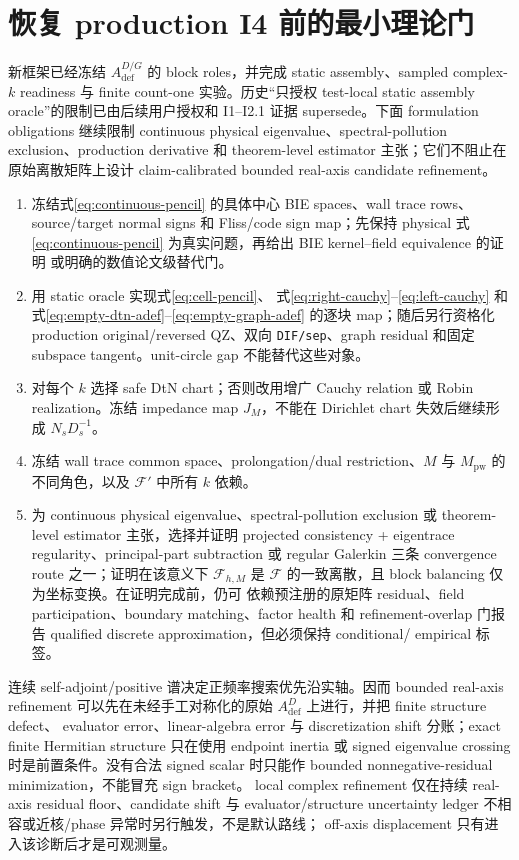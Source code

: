 \documentclass[UTF8,fontset=fandol,11pt,a4paper]{ctexart}
\newcommand{\cF}{\mathcal F}
\begin{document}
\section{恢复 production I4 前的最小理论门}

新框架已经冻结 $A_{\mathrm{def}}^{D/G}$ 的 block roles，并完成 static assembly、sampled
complex-$k$ readiness 与 finite count-one 实验。历史“只授权 test-local static assembly
oracle”的限制已由后续用户授权和 I1--I2.1 证据 supersede。下面 formulation obligations
继续限制 continuous physical eigenvalue、spectral-pollution exclusion、production
derivative 和 theorem-level estimator 主张；它们不阻止在原始离散矩阵上设计
claim-calibrated bounded real-axis candidate refinement。
\begin{enumerate}
  \item 冻结式\eqref{eq:continuous-pencil} 的具体中心 BIE spaces、wall trace rows、
  source/target normal signs 和 Fliss/code sign map；先保持 physical
  式\eqref{eq:continuous-pencil} 为真实问题，再给出 BIE kernel--field equivalence 的证明
  或明确的数值论文级替代门。
  \item 用 static oracle 实现式\eqref{eq:cell-pencil}、
  式\eqref{eq:right-cauchy}--\eqref{eq:left-cauchy} 和
  式\eqref{eq:empty-dtn-adef}--\eqref{eq:empty-graph-adef} 的逐块 map；随后另行资格化
  production original/reversed QZ、双向 \texttt{DIF/sep}、graph residual 和固定
  subspace tangent。unit-circle gap 不能替代这些对象。
  \item 对每个 $k$ 选择 safe DtN chart；否则改用增广 Cauchy relation 或 Robin
  realization。冻结 impedance map $J_M$，不能在 Dirichlet chart 失效后继续形成
  $N_sD_s^{-1}$。
  \item 冻结 wall trace common space、prolongation/dual restriction、$M$ 与
  $M_{\mathrm{pw}}$ 的不同角色，以及 $\cF'$ 中所有 $k$ 依赖。
  \item 为 continuous physical eigenvalue、spectral-pollution exclusion 或 theorem-level
  estimator 主张，选择并证明 projected consistency + eigentrace regularity、principal-part
  subtraction 或 regular Galerkin 三条 convergence route 之一；证明在该意义下
  $\cF_{h,M}$ 是 $\cF$ 的一致离散，且 block balancing 仅为坐标变换。在证明完成前，仍可
  依赖预注册的原矩阵 residual、field participation、boundary matching、factor health 和
  refinement-overlap 门报告 qualified discrete approximation，但必须保持 conditional/
  empirical 标签。
\end{enumerate}

连续 self-adjoint/positive 谱决定正频率搜索优先沿实轴。因而 bounded real-axis refinement
可以先在未经手工对称化的原始 $A_{\mathrm{def}}^D$ 上进行，并把 finite structure defect、
evaluator error、linear-algebra error 与 discretization shift 分账；exact finite Hermitian
structure 只在使用 endpoint inertia 或 signed eigenvalue crossing 时是前置条件。没有合法
signed scalar 时只能作 bounded nonnegative-residual minimization，不能冒充 sign bracket。
local complex refinement 仅在持续 real-axis residual floor、candidate shift 与
evaluator/structure uncertainty ledger 不相容或近核/phase 异常时另行触发，不是默认路线；
off-axis displacement 只有进入该诊断后才是可观测量。
\end{document}
